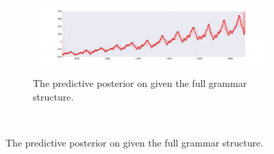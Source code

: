 \documentclass{article} %
\begin{document}
\begin{figure}
        \centering
        \begin{subfigure}[b]{\textwidth} \centering
                \includegraphics[height=3cm]{figs/airline_tree_3x.png}
                \caption{The predictive posterior on given the full grammar structure.}
                \label{fig:airlineBO}
        \end{subfigure}%
        ~ %
          

\end{figure}
\end{document}
